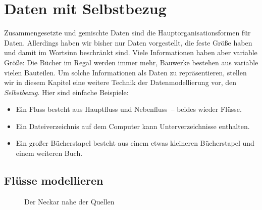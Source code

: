 
\chapter{Daten mit Selbstbezug}
\label{cha:selbstbezug}

Zusammengesetzte und gemischte Daten sind die Hauptorganisationsformen
für Daten.  Allerdings haben wir bisher nur Daten vorgestellt, die
feste Größe haben und damit im Wortsinn beschränkt sind.  Viele
Informationen haben aber variable Größe: Die Bücher im Regal werden
immer mehr, Bauwerke bestehen aus variable vielen Bauteilen.  Um
solche Informationen als Daten zu repräsentieren, stellen wir in
diesem Kapitel eine weitere Technik der Datenmodellierung vor, den
\textit{Selbstbezug}.  Hier sind einfache Beispiele:
%
\begin{itemize}
\item Ein Fluss besteht aus Hauptfluss und Nebenfluss~-- beides wieder
  Flüsse.
\item Ein Dateiverzeichnis auf dem Computer kann 
  Unterverzeichnisse enthalten.
\item Ein großer Bücherstapel besteht aus einem etwas kleineren
  Bücherstapel und einem weiteren Buch.
\end{itemize}

\section{Flüsse modellieren}

\begin{figure}[tbh]
  \centering
{}
  \caption{Der Neckar nahe der Quellen}
  \label{fig:neckar}
\end{figure}

